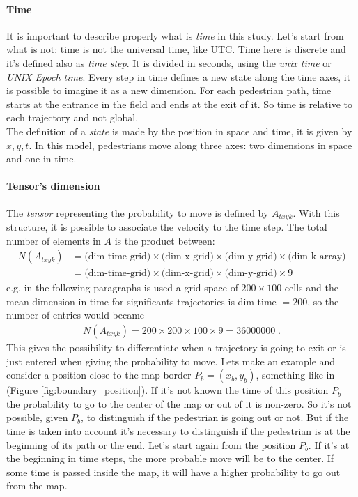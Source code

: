\documentclass[class=article, crop=false]{standalone}
\begin{document}
\paragraph{Time}
It is important to describe properly what is \emph{time} in this study.
Let's start from what is not: time is not the universal time, like UTC.
Time here is discrete and it's defined also as \emph{time step}.
It is divided in seconds, using the \emph{unix time} or \emph{UNIX Epoch time}.
Every step in time defines a new state along the time axes, it is possible to imagine it as a new dimension.
For each pedestrian path, time starts at the entrance in the field and ends at the exit of it.
So time is relative to each trajectory and not global.
\\The definition of a \emph{state} is made by the position in space and time, it is given by $x, y, t$.
In this model, pedestrians move along three axes: two dimensions in space and one in time.


\paragraph{Tensor's dimension}
The \emph{tensor} representing the probability to move is defined by $A_{t x y k}$.
With this structure, it is possible to associate the velocity to the time step.
The total number of elements in $A$ is the product between:
\begin{equation*}
\begin{split}
N(A_{t xyk}) &= \mbox{(dim-time-grid)} \times \mbox{(dim-x-grid)} \times \mbox{(dim-y-grid)} \times \mbox{(dim-k-array)} \\
& = \mbox{(dim-time-grid)} \times \mbox{(dim-x-grid)} \times \mbox{(dim-y-grid)} \times 9
\end{split}
\end{equation*}
e.g. in the following paragraphs is used a grid space of $200\times100$ cells and the mean dimension in time for significants trajectories is dim-time $ = 200$, so the number of entries would became 
\begin{equation*}
\begin{split}
N(A_{t xyk})=200 \times 200\times100\times 9 = 36000000 \; .
\end{split}
\end{equation*}
This gives the possibility to differentiate when a trajectory is going to exit or is just entered when giving the probability to move.
Lets make an example and consider a position close to the map border $P_b = (x_b, y_b)$, something like in (Figure \ref{fig:boundary_position}).
If it's not known the time of this position $P_b$ the probability to go to the center of the map or out of it is non-zero.
So it's not possible, given $P_b$, to distinguish if the pedestrian is going out or not.
But if the time is taken into account it's necessary to distinguish if the pedestrian is at the beginning of its path or the end.
Let's start again from the position $P_b$.
If it's at the beginning in time steps, the more probable move will be to the center.
If some time is passed inside the map, it will have a higher probability to go out from the map.
\end{document}
